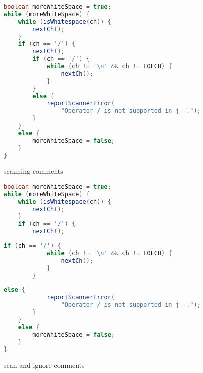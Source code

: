 \documentclass[8pt,a4paper,compress]{beamer}
\begin{document}
\begin{frame}[fragile]
\pause

\begin{overprint}
\begin{tcolorbox}[enhanced,drop shadow southwest,sharp corners,size=fbox,colback=white,fontlower=\small\ttfamily,collower=silver900]

\begin{lstlisting}[language=Java,style=focusin]
boolean moreWhiteSpace = true;
while (moreWhiteSpace) {
    while (isWhitespace(ch)) {
        nextCh();
    }
    if (ch == '/') {
        nextCh();
        if (ch == '/') { 
            while (ch != '\n' && ch != EOFCH) {
                nextCh();
            }
        }
        else {
            reportScannerError(
                "Operator / is not supported in j--.");
        }
    }
    else {
        moreWhiteSpace = false;
    }
}
\end{lstlisting}

\tcblower
\begin{minipage}[t][.25cm][t]{\textwidth}
scanning comments
\end{minipage}
\end{tcolorbox}

\begin{tcolorbox}[enhanced,drop shadow southwest,sharp corners,size=fbox,colback=white,fontlower=\small\ttfamily,collower=silver900]

\begin{lstlisting}[language=Java,style=focusout]
boolean moreWhiteSpace = true;
while (moreWhiteSpace) {
    while (isWhitespace(ch)) {
        nextCh();
    }
    if (ch == '/') {
        nextCh();
\end{lstlisting}
\begin{lstlisting}[language=Java,style=focusin,backgroundcolor=\color{lime100}]
        if (ch == '/') { 
            while (ch != '\n' && ch != EOFCH) {
                nextCh();
            }
        }
\end{lstlisting}
\begin{lstlisting}[language=Java,style=focusout]
        else {
            reportScannerError(
                "Operator / is not supported in j--.");
        }
    }
    else {
        moreWhiteSpace = false;
    }
}
\end{lstlisting}

\tcblower
\begin{minipage}[t][.25cm][t]{\textwidth}
scan and ignore comments
\end{minipage}
\end{tcolorbox}


\end{overprint}
\end{frame}
\end{document}

